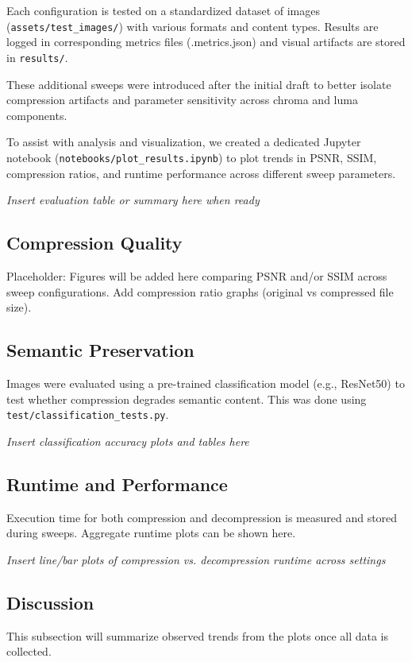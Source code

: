 Each configuration is tested on a standardized dataset of images (\texttt{assets/test\_images/}) with various formats and content types. Results are logged in corresponding metrics files (.metrics.json) and visual artifacts are stored in \texttt{results/}.

These additional sweeps were introduced after the initial draft to better isolate compression artifacts and parameter sensitivity across chroma and luma components.

To assist with analysis and visualization, we created a dedicated Jupyter notebook (\texttt{notebooks/plot\_results.ipynb}) to plot trends in PSNR, SSIM, compression ratios, and runtime performance across different sweep parameters.

\textit{Insert evaluation table or summary here when ready}

\subsection{Compression Quality}
Placeholder: Figures will be added here comparing PSNR and/or SSIM across sweep configurations. Add compression ratio graphs (original vs compressed file size).

\subsection{Semantic Preservation}
Images were evaluated using a pre-trained classification model (e.g., ResNet50) to test whether compression degrades semantic content. This was done using \texttt{test/classification\_tests.py}.


\textit{Insert classification accuracy plots and tables here}

\subsection{Runtime and Performance}
Execution time for both compression and decompression is measured and stored during sweeps. Aggregate runtime plots can be shown here.


\textit{Insert line/bar plots of compression vs. decompression runtime across settings}

\subsection{Discussion}
This subsection will summarize observed trends from the plots once all data is collected.

